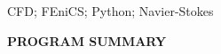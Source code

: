\documentclass[final,3p,times,twocolumn]{elsarticle}
\begin{document}
\begin{frontmatter}
\begin{abstract}
%
%
%

\end{abstract}

\begin{keyword}
CFD; FEniCS; Python; Navier-Stokes

\end{keyword}

\end{frontmatter}



{\bf PROGRAM SUMMARY}
\end{document}
